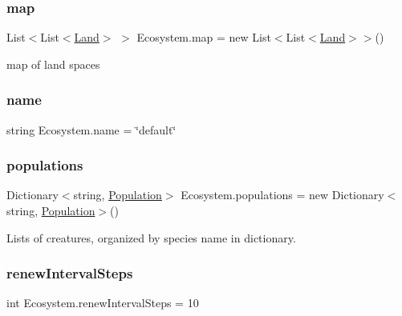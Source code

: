 \subsubsection{\texorpdfstring{map}{map}}
{\footnotesize\ttfamily List$<$List$<$\mbox{\hyperlink{class_land}{Land}}$>$ $>$ Ecosystem.\+map = new List$<$List$<$\mbox{\hyperlink{class_land}{Land}}$>$$>$()}



map of land spaces 

\mbox{\label{class_ecosystem_ae22d1e48d43e1818705c5eda52785f63}} 
\subsubsection{\texorpdfstring{name}{name}}
{\footnotesize\ttfamily string Ecosystem.\+name = \char`\"{}default\char`\"{}}

\mbox{\label{class_ecosystem_a8b17a9aebf9aa2619901cd3fe96c8d66}} 
\subsubsection{\texorpdfstring{populations}{populations}}
{\footnotesize\ttfamily Dictionary$<$string, \mbox{\hyperlink{class_population}{Population}}$>$ Ecosystem.\+populations = new Dictionary$<$string, \mbox{\hyperlink{class_population}{Population}}$>$()}



Lists of creatures, organized by species name in dictionary. 

\mbox{\label{class_ecosystem_a6856c0300199a5acee23d631f18f4a46}} 
\subsubsection{\texorpdfstring{renew\+Interval\+Steps}{renewIntervalSteps}}
{\footnotesize\ttfamily int Ecosystem.\+renew\+Interval\+Steps = 10}

\mbox{\label{class_ecosystem_adf42dce1cde9124f1ffb5b729967fc1a}} 

